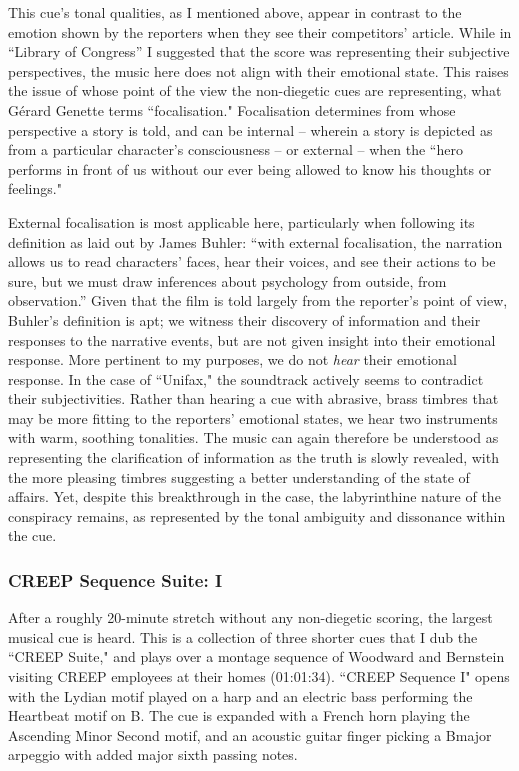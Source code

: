 This cue’s tonal qualities, as I mentioned above, appear in contrast to the emotion shown by the reporters when they see their competitors' article.
While in “Library of Congress” I suggested that the score was representing their subjective perspectives, the music here does not align with their emotional state.
This raises the issue of whose point of the view the non-diegetic cues are representing, what Gérard Genette terms ``focalisation."
Focalisation determines from whose perspective a story is told, and can be internal – wherein a story is depicted as from a particular character’s consciousness – or external  – when the ``hero performs in front of us without our ever being allowed to know his thoughts or feelings."\autocites[][190]{genette_narrative_1980}

External focalisation is most applicable here, particularly when following its definition as laid out by James Buhler: 
``with external focalisation, the narration allows us to read characters’ faces, hear their voices, and see their actions to be sure, but we must draw inferences about psychology from outside, from observation.”\autocites[][177]{buhler_theories_2018}
Given that the film is told largely from the reporter’s point of view, Buhler’s definition is apt; we witness their discovery of information and their responses to the narrative events, but are not given insight into their emotional response.
More pertinent to my purposes, we do not \textit{hear} their emotional response.
In the case of ``Unifax," the soundtrack actively seems to contradict their subjectivities.
Rather than hearing a cue with abrasive, brass timbres that may be more fitting to the reporters’ emotional states, we hear two instruments with warm, soothing tonalities.
The music can again therefore be understood as representing the clarification of information as the truth is slowly revealed, with the more pleasing timbres suggesting a better understanding of the state of affairs.
Yet, despite this breakthrough in the case, the labyrinthine nature of the conspiracy remains, as represented by the tonal ambiguity and dissonance within the cue.


\subsubsection{CREEP Sequence Suite: I}

After a roughly 20-minute stretch without any non-diegetic scoring, the largest musical cue is heard.
This is a collection of three shorter cues that I dub the ``CREEP Suite," and plays over a montage sequence of Woodward and Bernstein visiting CREEP employees at their homes (01:01:34).
``CREEP Sequence I" opens with the Lydian motif played on a harp and an electric bass performing the Heartbeat motif on B\flat.
The cue is expanded with a French horn playing the Ascending Minor Second motif, and an acoustic guitar finger picking a B\flat major arpeggio with added major sixth passing notes.

